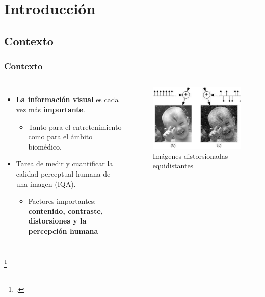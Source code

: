 \section[Introducción]{Introducción}
\subsection[Contexto]{Contexto}
\begin{frame}
    \frametitle{Contexto}
    \begin{columns}
    \begin{itemize}
      \item \textbf{La información visual} es cada vez más \textbf{importante}.
        \begin{itemize}
          \item Tanto para el entretenimiento como para el ámbito biomédico.
        \end{itemize}
      \item{Tarea de medir y cuantificar} la calidad perceptual humana de una imagen (IQA). 
        \begin{itemize}
          \item Factores importantes: \textbf{contenido, contraste, distorsiones y la percepción humana}
        \end{itemize}
    \end{itemize}
    \begin{figure}
      \begin{center}
        \includegraphics[width=\textwidth]{imagenes/chapter1/failure_minkowski_metricBIG}
      \end{center}
      \caption{Imágenes distorsionadas equidistantes\footnotemark}
    \end{figure}
  \end{columns}
  \vspace{-.2cm}
  \footcitetext{MinkowskiFailure}
\end{frame}

